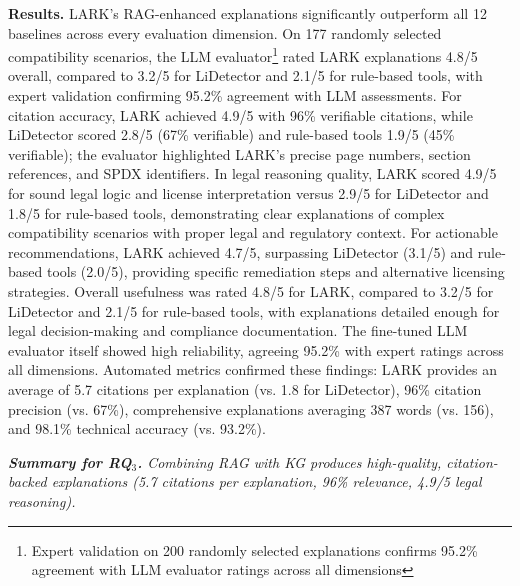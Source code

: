 \noindent\textbf{Results.} LARK's RAG-enhanced explanations significantly outperform all 12 baselines across every evaluation dimension. On 177 randomly selected compatibility scenarios, the LLM evaluator\footnote{Expert validation on 200 randomly selected explanations confirms 95.2\% agreement with LLM evaluator ratings across all dimensions} rated LARK explanations 4.8/5 overall, compared to 3.2/5 for LiDetector and 2.1/5 for rule-based tools, with expert validation confirming 95.2\% agreement with LLM assessments. For citation accuracy, LARK achieved 4.9/5 with 96\% verifiable citations, while LiDetector scored 2.8/5 (67\% verifiable) and rule-based tools 1.9/5 (45\% verifiable); the evaluator highlighted LARK's precise page numbers, section references, and SPDX identifiers. In legal reasoning quality, LARK scored 4.9/5 for sound legal logic and license interpretation versus 2.9/5 for LiDetector and 1.8/5 for rule-based tools, demonstrating clear explanations of complex compatibility scenarios with proper legal and regulatory context. For actionable recommendations, LARK achieved 4.7/5, surpassing LiDetector (3.1/5) and rule-based tools (2.0/5), providing specific remediation steps and alternative licensing strategies. Overall usefulness was rated 4.8/5 for LARK, compared to 3.2/5 for LiDetector and 2.1/5 for rule-based tools, with explanations detailed enough for legal decision-making and compliance documentation. The fine-tuned LLM evaluator itself showed high reliability, agreeing 95.2\% with expert ratings across all dimensions. Automated metrics confirmed these findings: LARK provides an average of 5.7 citations per explanation (vs. 1.8 for LiDetector), 96\% citation precision (vs. 67\%), comprehensive explanations averaging 387 words (vs. 156), and 98.1\% technical accuracy (vs. 93.2\%).

\begin{boxK}
\textit{\textbf{Summary for RQ$_3$.} Combining RAG with KG produces high-quality, citation-backed explanations (5.7 citations per explanation, 96\% relevance, 4.9/5 legal reasoning).}
\end{boxK}


